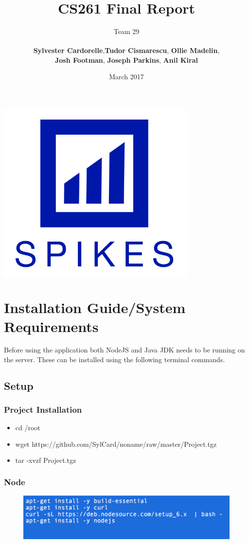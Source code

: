 \documentclass[12pt]{article}
\title{CS261 Final Report}
\author{Team 29 \\\\ \textbf{Sylvester Cardorelle},\textbf{Tudor Cismarescu}, \textbf{Ollie Madelin},\\
\textbf{Josh Footman}, \textbf{Joseph Parkins}, \textbf{Anil Kiral}}
\date{March 2017}
\begin{document}
\begin{titlepage}
\maketitle
\centering
\vfill
\vfill
\includegraphics[width=10cm]{logo.png}
\vfill
\vfill
\thispagestyle{empty}
\end{titlepage}
\tableofcontents
\newpage
\section{Installation Guide/System Requirements }
  Before using the application both NodeJS and Java JDK needs to be running on the server.
  These can be installed using the following terminal commands.
	\subsection{Setup}
    \subsubsection{Project Installation}
    \begin{itemize}
      \item cd /root
      \item wget https://github.com/SylCard/noname/raw/master/Project.tgz
      \item tar -xvzf Project.tgz
    \end{itemize}
		\subsubsection{Node}
    \begin{figure}[H]
    \centering
    \includegraphics[width=120mm]{node.png}
    \end{figure}
\end{document}
